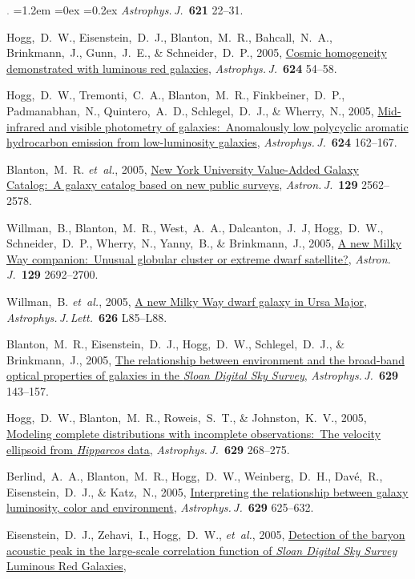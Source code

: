\documentclass[10pt,letterpaper]{article}
\newcommand{\foreign}[1]{\textsl{#1}}
\newcommand{\etal}{\foreign{et~al.}}
\newcommand{\project}[1]{\textsl{#1}}
\newcommand{\doi}[2]{\href{http://dx.doi.org/#1}{{#2}}}
\newcommand{\deemph}[1]{\textcolor{grey}{\footnotesize{#1}}}
\newcommand{\pubnumber}[1]{\deemph{{#1}.}}
\newcounter{refpubnum}
\newcommand{\hogglist}{%
    \rightmargin=0in
    \leftmargin=1.2em
    \topsep=0ex
    \partopsep=0pt
    \itemsep=0.2ex
    \parsep=0pt
    \itemindent=-1.0\leftmargin
    \listparindent=0.0\leftmargin
    \settowidth{\labelsep}{~}
    \usecounter{refpubnum}
  }
\begin{document}
\begin{list}{\pubnumber{\therefpubnum}}{\hogglist}
\textit{Astrophys.\,J.}\ \textbf{621} 22--31.
\item
Hogg,~D.~W., Eisenstein,~D.~J., Blanton,~M.~R., Bahcall,~N.~A., Brinkmann,~J., Gunn,~J.~E., \& Schneider,~D.~P., 2005,
\doi{10.1086/429084}{Cosmic homogeneity demonstrated with luminous red galaxies},
\textit{Astrophys.\,J.}\ \textbf{624} 54--58.
\item
Hogg,~D.~W., Tremonti,~C.~A., Blanton,~M.~R., Finkbeiner,~D.~P., Padmanabhan,~N., Quintero,~A.~D., Schlegel,~D.~J., \& Wherry,~N., 2005,
\doi{10.1086/429686}{Mid-infrared and visible photometry of galaxies:\ Anomalously low polycyclic aromatic hydrocarbon emission from low-luminosity galaxies},
\textit{Astrophys.\,J.}\ \textbf{624} 162--167.
\item
Blanton,~M.~R. \etal, 2005,
\doi{10.1086/429803}{New York University Value-Added Galaxy Catalog:\ A galaxy catalog based on new public surveys},
\textit{Astron.\,J.}\ \textbf{129} 2562--2578.
\item
Willman,~B., Blanton,~M.~R., West,~A.~A., Dalcanton,~J.~J, Hogg,~D.~W., Schneider,~D.~P., Wherry,~N., Yanny,~B., \& Brinkmann,~J., 2005,
\doi{10.1086/430214}{A new Milky Way companion:\ Unusual globular cluster or extreme dwarf satellite?},
\textit{Astron.\,J.}\ \textbf{129} 2692--2700.
\item\label{pub:Willman2005b}
Willman,~B. \etal, 2005,
\doi{10.1086/431760}{A new Milky Way dwarf galaxy in Ursa Major},
\textit{Astrophys.\,J.\,Lett.}\ \textbf{626} L85--L88.
\item
Blanton,~M.~R., Eisenstein,~D.~J., Hogg,~D.~W., Schlegel,~D.~J., \& Brinkmann,~J., 2005,
\doi{10.1086/422897}{The relationship between environment and the broad-band optical properties of galaxies in the \project{Sloan Digital Sky Survey}},
\textit{Astrophys.\,J.}\ \textbf{629} 143--157.
\item
Hogg,~D.~W., Blanton,~M.~R., Roweis,~S.~T., \& Johnston,~K.~V., 2005,
\doi{10.1086/431572}{Modeling complete distributions with incomplete observations:\ The velocity ellipsoid from \project{Hipparcos} data},
\textit{Astrophys.\,J.}\ \textbf{629} 268--275.
\item
Berlind,~A.~A., Blanton,~M.~R., Hogg,~D.~W., Weinberg,~D.~H., Dav\'e,~R., Eisenstein,~D.~J., \& Katz,~N., 2005,
\doi{10.1086/431658}{Interpreting the relationship between galaxy luminosity, color and environment},
\textit{Astrophys.\,J.}\ \textbf{629} 625--632.
\item\label{pub:Eisenstein2005}
Eisenstein,~D.~J., Zehavi,~I., Hogg,~D.~W., \etal, 2005,
\doi{10.1086/466512}{Detection of the baryon acoustic peak in the large-scale correlation function of \project{Sloan Digital Sky Survey} Luminous Red Galaxies},

\end{list}
\end{document}
